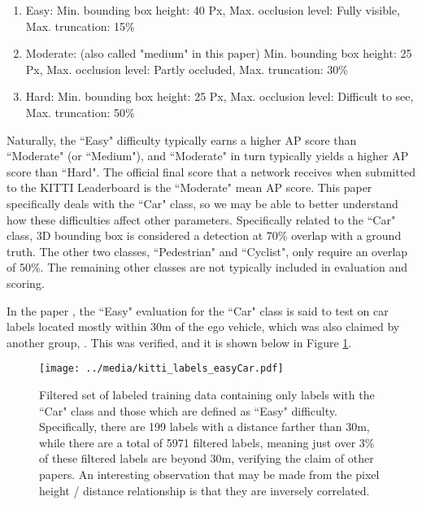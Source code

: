 \begin{enumerate}\itemsep=-0.5em
	\item Easy: Min. bounding box height: 40 Px, Max. occlusion level: Fully visible, Max. truncation: 15\%
	\item Moderate: (also called "medium" in this paper) Min. bounding box height: 25 Px, Max. occlusion level: Partly occluded, Max. truncation: 30\%
	\item Hard: Min. bounding box height: 25 Px, Max. occlusion level: Difficult to see, Max. truncation: 50\%
\end{enumerate}

Naturally, the ``Easy" difficulty typically earns a higher AP score than ``Moderate" (or ``Medium"), and ``Moderate" in turn typically yields a higher AP score than ``Hard". The official final score that a network receives when submitted to the KITTI Leaderboard is the ``Moderate" mean AP score. This paper specifically deals with the ``Car" class, so we may be able to better understand how these difficulties affect other parameters. Specifically related to the ``Car" class, 3D bounding box is considered a detection at 70\% overlap with a ground truth. The other two classes, ``Pedestrian" and ``Cyclist", only require an overlap of 50\%. The remaining other classes are not typically included in evaluation and scoring.

In the paper \cite{wang_pseudo-lidar_2019}, the ``Easy" evaluation for the ``Car" class is said to test on car labels located mostly within 30m of the ego vehicle, which was also claimed by another group, \cite{yang_pixor:_2018}. This was verified, and it is shown below in Figure \ref{kitti_labels_easyCar}.

\begin{figure}[H]
	\centering
	\texttt{[image: ../media/kitti\_labels\_easyCar.pdf]}
	\caption{Filtered set of labeled training data containing only labels with the ``Car" class and those which are defined as ``Easy" difficulty. Specifically, there are 199 labels with a distance farther than 30m, while there are a total of 5971 filtered labels, meaning just over 3\% of these filtered labels are beyond 30m, verifying the claim of other papers. An interesting observation that may be made from the pixel height / distance relationship is that they are inversely correlated.}
	\label{kitti_labels_easyCar}
\end{figure}


